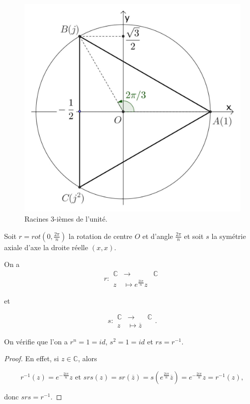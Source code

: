 \documentclass[french]{book}
\theoremstyle{definition}
\theoremstyle{remark}
\begin{document}
\begin{figure}[h!]
  \centering
  \includegraphics[scale=0.3]{figures/racines-3.jpg}
  \caption{Racines 3-ièmes de l'unité.}
  \label{}
\end{figure}

Soit $r = rot(0, \frac{2 \pi}{n})$ la rotation de centre $O$ et d'angle $\frac{2 \pi}{n}$ et soit $s$ la symétrie axiale d'axe la droite réelle $(x,x)$.

On a \[
r:\begin{array}{rcl}
\mathbb{C} & \longrightarrow & \mathbb{C} \\
z & \longmapsto e^{\frac{2 i \pi}{n}} z
\end{array}
\]

et

\[
s:
  \begin{array}{rcl}
  \mathbb{C} & \longrightarrow & \mathbb{C} \\
  z & \longmapsto \overline{z}
  \end{array}.
\]


On vérifie que l'on a $r ^{n} = 1 = id$, $s ^2 = 1 =id$ et $rs = r ^{-1} $.

\begin{proof}
  En effet, si $z \in \mathbb{C}$, alors

  \[
  r ^{-1} (z) = e^{- \frac{2 i \pi}{n}} z \text{ et } s r s(z) = s r (\overline{z} ) = s \left( e^{\frac{2 i \pi}{n}} \overline{z} \right) = e^{- \frac{2 i \pi}{n}} z = r ^{-1} (z),
  \]

  donc $s r s = r ^{-1} $.
\end{proof}
\end{document}
